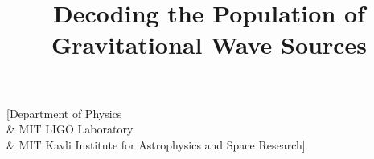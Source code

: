 \documentclass[twoside]{mitthesis}
\begin{document}

\title{Decoding the Population of Gravitational Wave Sources}

%
%

%


%
 [Department of Physics
 \\ & MIT LIGO Laboratory
 \\ & MIT Kavli Institute for Astrophysics and Space Research]


%
\end{document}

